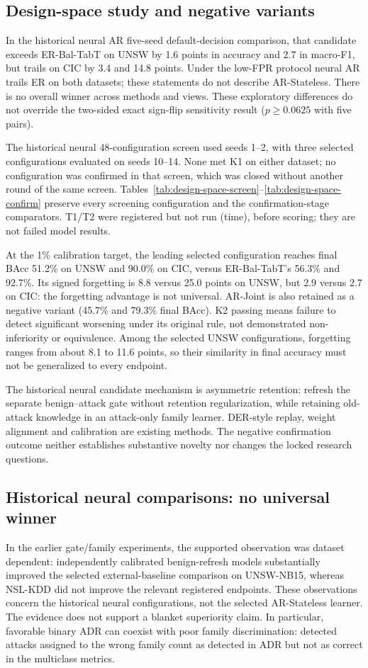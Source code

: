 \documentclass[10pt,twocolumn]{article}
\begin{document}
\subsection{Design-space study and negative variants}
In the historical neural AR five-seed default-decision comparison, that candidate exceeds ER-Bal-TabT on UNSW by 1.6 points in accuracy and 2.7 in macro-F1, but trails on CIC by 3.4 and 14.8 points. Under the low-FPR protocol neural AR trails ER on both datasets; these statements do not describe AR-Stateless. There is no overall winner across methods and views. These exploratory differences do not override the two-sided exact sign-flip sensitivity result ($p\geq0.0625$ with five pairs).

The historical neural 48-configuration screen used seeds 1--2, with three selected configurations evaluated on seeds 10--14. None met K1 on either dataset; no configuration was confirmed in that screen, which was closed without another round of the same screen. Tables~\ref{tab:design-space-screen}--\ref{tab:design-space-confirm} preserve every screening configuration and the confirmation-stage comparators. T1/T2 were registered but not run (time), before scoring; they are not failed model results.

At the 1\% calibration target, the leading selected configuration reaches final BAcc 51.2\% on UNSW and 90.0\% on CIC, versus ER-Bal-TabT's 56.3\% and 92.7\%. Its signed forgetting is 8.8 versus 25.0 points on UNSW, but 2.9 versus 2.7 on CIC: the forgetting advantage is not universal. AR-Joint is also retained as a negative variant (45.7\% and 79.3\% final BAcc). K2 passing means failure to detect significant worsening under its original rule, not demonstrated non-inferiority or equivalence. Among the selected UNSW configurations, forgetting ranges from about 8.1 to 11.6 points, so their similarity in final accuracy must not be generalized to every endpoint.

The historical neural candidate mechanism is asymmetric retention: refresh the separate benign--attack gate without retention regularization, while retaining old-attack knowledge in an attack-only family learner. DER-style replay, weight alignment and calibration are existing methods. The negative confirmation outcome neither establishes substantive novelty nor changes the locked research questions.
\subsection{Historical neural comparisons: no universal winner}
In the earlier gate/family experiments, the supported observation was dataset dependent: independently calibrated benign-refresh models substantially improved the selected external-baseline comparison on UNSW-NB15, whereas NSL-KDD did not improve the relevant registered endpoints. These observations concern the historical neural configurations, not the selected AR-Stateless learner. The evidence does not support a blanket superiority claim. In particular, favorable binary ADR can coexist with poor family discrimination: detected attacks assigned to the wrong family count as detected in ADR but not as correct in the multiclass metrics.
\end{document}
